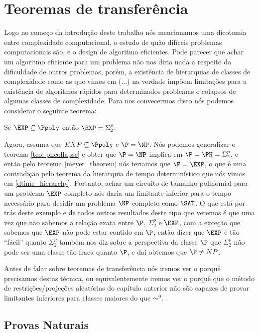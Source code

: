 \chapter{Teoremas de transferência}

Logo no começo da introdução deste trabalho nós mencionamos uma dicotomia entre complexidade computacional, o estudo de quão difíceis problemas computacionais são, e  o design de algoritmo eficientes. Pode parecer que achar um algoritmo eficiente para um problema não nos diria nada a respeito da dificuldade de outros problemas, porém, a existência de hierarquias de classes de complexidade como as que vimos em (...) na verdade impõem limitações para a existência de algoritmos rápidos para determinados problemas e colapsos de algumas classes de complexidade. Para nos convecermos disto nós podemos considerar o seguinte teorema:

\begin{teo} [Meyer] \label{meyer_theorem}

Se $\EXP \subseteq \Ppoly$ então $\EXP = \Sigma_{2}^{p}$.

\end{teo}

Agora, assuma que $EXP \subseteq \Ppoly$ e $\P = \NP$. Nós podemos generalizar o teorema \ref{teo: phcollapse} e obter que $\P = \NP$ implica em $\P = \PH = \Sigma_{2}^{p}$, e então pelo teorema \ref{meyer_theorem} nós teriamos que $\P = \EXP$, o que é uma contradição pelo teorema da hierarquia de tempo determinístico que nós vimos em \ref{dtime_hierarchy}. Portanto, achar um circuito de tamanho polinomial para um problema $\EXP$-completo nós daria um limitante inferior para o tempo necessário para decidir um problema $\NP$-completo como $\SAT$. O que está por trás deste exemplo e de todos outros resultados deste tipo que veremos é que uma vez que não sabemos a relação exata entre $\P$, $\Sigma_{2}^{p}$ e $\EXP$, com a exceção que sabemos que $\EXP$ não pode estar contido em $\P$, então dizer que $\EXP$ é tão ``fácil'' quanto $\Sigma_{2}^{p}$ também nos diz sobre a perspectiva da classe $\P$ que $\Sigma_{2}^{p}$ não pode ser uma classe tão fraca quanto $\P$, e daí obtemos que $\P \neq NP$.

Antes de falar sobre teoremas de transferência nós iremos ver o porquê precisamos destas técnica, ou equivalentemente iremos ver o porquê que o método de restrições/projeções aleatórias do capítulo anterior não são capazes de provar limitantes inferiores para classes maiores do que $\AC^{0}$.

\section{Provas Naturais} 
